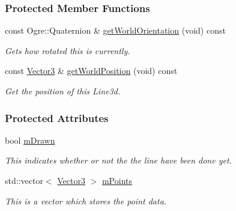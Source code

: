 \subsubsection*{Protected Member Functions}
\begin{DoxyCompactItemize}
\item 
const Ogre::Quaternion \& \hyperlink{classphys_1_1internal_1_1Line3D_a68aea39fc0eee3eeb744c5cd151ef209}{getWorldOrientation} (void) const 
\begin{DoxyCompactList}\small\item\em Gets how rotated this is currently. \item\end{DoxyCompactList}\item 
const \hyperlink{classphys_1_1Vector3}{Vector3} \& \hyperlink{classphys_1_1internal_1_1Line3D_a5bf47edcb7d369718c40c56d9db11b29}{getWorldPosition} (void) const 
\begin{DoxyCompactList}\small\item\em Get the position of this Line3d. \item\end{DoxyCompactList}\end{DoxyCompactItemize}
\subsubsection*{Protected Attributes}
\begin{DoxyCompactItemize}
\item 
\hypertarget{classphys_1_1internal_1_1Line3D_a7f3a190db3c0cd83ff4fdf3d95d6f0ee}{
bool \hyperlink{classphys_1_1internal_1_1Line3D_a7f3a190db3c0cd83ff4fdf3d95d6f0ee}{mDrawn}}
\label{classphys_1_1internal_1_1Line3D_a7f3a190db3c0cd83ff4fdf3d95d6f0ee}

\begin{DoxyCompactList}\small\item\em This indicates whether or not the the line have been done yet. \item\end{DoxyCompactList}\item 
\hypertarget{classphys_1_1internal_1_1Line3D_acb6b813e2d713dbad02fe5a5ca1af97e}{
std::vector$<$ \hyperlink{classphys_1_1Vector3}{Vector3} $>$ \hyperlink{classphys_1_1internal_1_1Line3D_acb6b813e2d713dbad02fe5a5ca1af97e}{mPoints}}
\label{classphys_1_1internal_1_1Line3D_acb6b813e2d713dbad02fe5a5ca1af97e}

\begin{DoxyCompactList}\small\item\em This is a vector which stores the point data. \item\end{DoxyCompactList}\end{DoxyCompactItemize}


